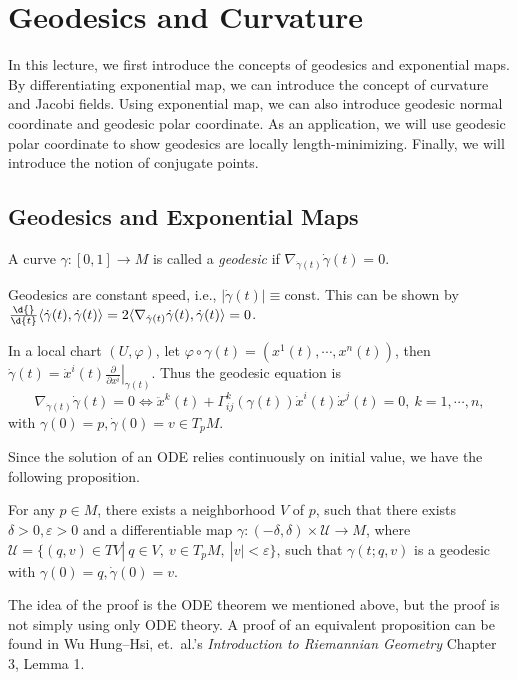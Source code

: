 \chapter{Geodesics and Curvature}
In this lecture, we first introduce the concepts of geodesics and exponential maps.
By differentiating exponential map, we can introduce the concept of curvature and Jacobi fields.
Using exponential map, we can also introduce geodesic normal coordinate and geodesic polar coordinate.
As an application, we will use geodesic polar coordinate to show geodesics are locally length-minimizing.
Finally, we will introduce the notion of conjugate points.

\section{Geodesics and Exponential Maps}
\begin{defn}
    A curve $\gamma:[0,1]\to M$ is called a \emph{geodesic} if $\nabla_{\dot{\gamma}(t)}\dot{\gamma}(t)=0$.
\end{defn}

\begin{rem}
    Geodesics are constant speed, i.e., $|\dot{\gamma}(t)|\equiv\text{const}$.
    This can be shown by $\frac{\d{}}{\d{t}}\langle\dot{\gamma}(t),\dot{\gamma}(t)\rangle=2\langle\nabla_{\dot{\gamma}(t)}\dot{\gamma}(t),\dot{\gamma}(t)\rangle=0$.
\end{rem}

In a local chart $(U,\varphi)$, let $\varphi\circ\gamma(t)=(x^1(t),\cdots,x^n(t))$, then $\dot{\gamma}(t)=\dot{x}^i(t)\left.\frac{\partial{}}{\partial{x^i}}\right|_{\gamma(t)}$.
Thus the geodesic equation is
\[\nabla_{\dot{\gamma}(t)}\dot{\gamma}(t)=0\iff\ddot{x}^k(t)+\Gamma^k_{ij}(\gamma(t))\dot{x}^i(t)\dot{x}^j(t)=0,\ k=1,\cdots,n,\]
with $\gamma(0)=p,\dot{\gamma}(0)=v\in T_pM$.

Since the solution of an ODE relies continuously on initial value, we have the following proposition.
\begin{prop}\label{geodesic in nbhd}
    For any $p\in M$, there exists a neighborhood $V$ of $p$, such that there exists $\delta>0,\varepsilon>0$ and a differentiable map $\gamma:(-\delta,\delta)\times\mathscr{U}\to M$, where $\mathscr{U}=\{(q,v)\in TV|\ q\in V,\ v\in T_pM,\ |v|<\varepsilon\}$, such that $\gamma(t;q,v)$ is a geodesic with $\gamma(0)=q,\dot{\gamma}(0)=v$.
\end{prop}
The idea of the proof is the ODE theorem we mentioned above, but the proof is not simply using only ODE theory.
A proof of an equivalent proposition can be found in Wu Hung--Hsi, et.\ al.'s \emph{Introduction to Riemannian Geometry} Chapter 3, Lemma 1.

